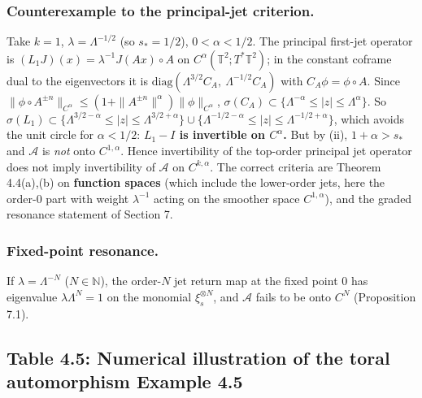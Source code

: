 \documentclass[11pt,a4paper]{article}
\theoremstyle{plain}
\theoremstyle{definition}
\theoremstyle{remark}
\numberwithin{equation}{section}
\numberwithin{figure}{section}
\begin{document}
\subsubsection{Counterexample to the principal-jet criterion.} Take $k=1$, $\lambda=\Lambda^{-1/2}$ (so $s_*=1/2$), $0<\alpha<1/2$. The principal first-jet operator is $(L_1J)(x)=\lambda^{-1}J(Ax)\circ A$ on $C^\alpha(\mathbb T^2;T^*\mathbb T^2)$; in the constant coframe dual to the eigenvectors it is $\mathrm{diag}(\Lambda^{3/2}C_A,\ \Lambda^{-1/2}C_A)$ with $C_A\phi=\phi\circ A$. Since $\|\phi\circ A^{\pm n}\|_{C^\alpha}\le(1+\|A^{\pm n}\|^\alpha)\|\phi\|_{C^\alpha}$, $\sigma(C_A)\subset\{\Lambda^{-\alpha}\le|z|\le\Lambda^\alpha\}$. So $\sigma(L_1)\subset\{\Lambda^{3/2-\alpha}\le|z|\le\Lambda^{3/2+\alpha}\}\cup\{\Lambda^{-1/2-\alpha}\le|z|\le\Lambda^{-1/2+\alpha}\}$, which avoids the unit circle for $\alpha<1/2$: \textbf{$L_1-I$ is invertible on $C^\alpha$.} But by (ii), $1+\alpha>s_*$ and $\mathcal A$ is \textit{not} onto $C^{1,\alpha}$. Hence invertibility of the top-order principal jet operator does not imply invertibility of $\mathcal A$ on $C^{k,\alpha}$. The correct criteria are Theorem 4.4(a),(b) on \textbf{function spaces} (which include the lower-order jets, here the order-$0$ part with weight $\lambda^{-1}$ acting on the smoother space $C^{1,\alpha}$), and the graded resonance statement of Section 7.

\subsubsection{Fixed-point resonance.} If $\lambda=\Lambda^{-N}$ ($N\in\mathbb N$), the order-$N$ jet return map at the fixed point $0$ has eigenvalue $\lambda\Lambda^N=1$ on the monomial $\xi_s^{\otimes N}$, and $\mathcal A$ fails to be onto $C^N$ (Proposition 7.1).

\subsection{Table 4.5: Numerical illustration of the toral automorphism Example 4.5}
\end{document}
